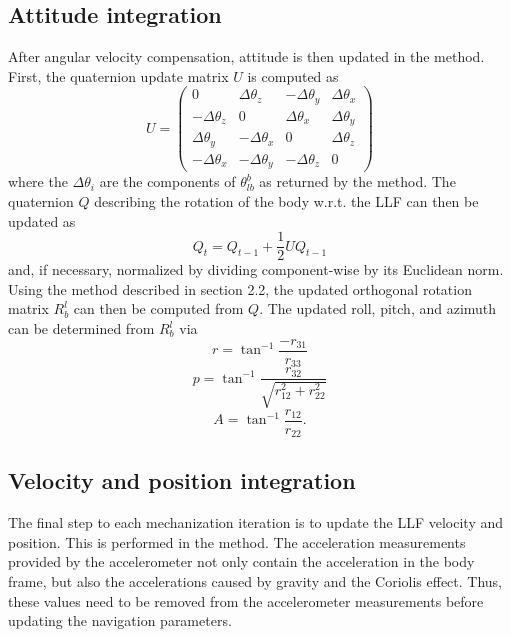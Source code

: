 \documentclass[11pt, oneside]{article}   	%
\begin{document}
\subsection{Attitude integration}
After angular velocity compensation, attitude is then updated in the  method. First, the quaternion update matrix $U$ is computed as
$$U=\begin{pmatrix}
0 & \Delta\theta_z & -\Delta\theta_y & \Delta\theta_x \\
-\Delta\theta_z & 0 & \Delta\theta_x & \Delta\theta_y \\
\Delta\theta_y & -\Delta\theta_x & 0 & \Delta\theta_z \\
-\Delta\theta_x & -\Delta\theta_y & -\Delta\theta_z & 0 
\end{pmatrix}$$
where the $\Delta\theta_i$ are the components of $\theta_{lb}^b$ as returned by the  method.  The quaternion $Q$ describing the rotation of the body w.r.t. the LLF can then be updated as
$$Q_t=Q_{t-1}+\frac12UQ_{t-1}$$
and, if necessary, normalized by dividing component-wise by its Euclidean norm. Using the method described in section 2.2, the updated orthogonal rotation matrix $R_b^l$ can then be computed from $Q$.
The updated roll, pitch, and azimuth can be determined from $R_b^l$ via 
$$r=\tan^{-1}\frac{-r_{31}}{r_{33}}$$
$$p=\tan^{-1}\frac{r_{32}}{\sqrt{r_{12}^2+r_{22}^2}}$$
$$A=\tan^{-1}\frac{r_{12}}{r_{22}}.$$

\subsection{Velocity and position integration}
The final step to each mechanization iteration is to update the LLF velocity and position.  This is performed in the  method.  
The acceleration measurements provided by the accelerometer not only contain the acceleration in the body frame, but also the accelerations caused by gravity and the Coriolis effect. Thus, these values need to be removed from the accelerometer measurements before updating the navigation parameters.
\end{document}
